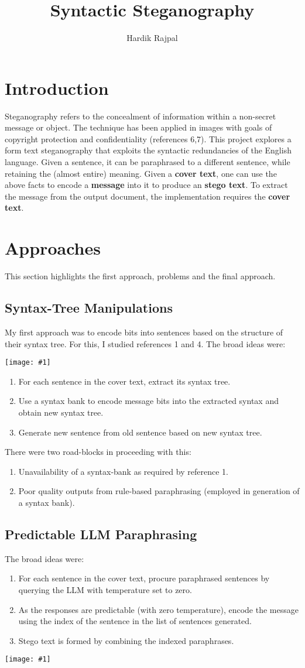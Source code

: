 \documentclass{article}
\author{Hardik Rajpal}
\title{Syntactic Steganography}
\makeatletter
\def\maxwidth#1{\ifdim\Gin@nat@width>#1 #1\else\Gin@nat@width\fi}
\newcommand{\mygraphic}[1]{
\begin{center}
    \texttt{[image: \#1]}
\end{center}
}
\makeatother
\begin{document}
\maketitle
\section{Introduction}
Steganography refers to the concealment of information within a non-secret message or object. The technique has been applied in images with goals of copyright protection and confidentiality (references 6,7). This project explores a form text steganography that exploits the syntactic redundancies of the English language. Given a sentence, it can be
paraphrased to a different sentence, while retaining the (almost entire) meaning. Given a \textbf{cover text}, one can use the above facts to encode a \textbf{message} into it to produce an \textbf{stego text}. To extract the message from the output document, the implementation requires the \textbf{cover text}.
\section{Approaches}
This section highlights the first approach, problems and the final approach.
\subsection{Syntax-Tree Manipulations}
My first approach was to encode bits into sentences based on the structure of their syntax tree. For this, I studied references 1 and 4. The broad ideas were:
\mygraphic{rsrc/syntaxtree.png}
\begin{enumerate}
\item For each sentence in the cover text, extract its syntax tree.
\item Use a syntax bank to encode message bits into the extracted syntax and obtain new syntax tree.
\item Generate new sentence from old sentence based on new syntax tree.
\end{enumerate}
There were two road-blocks in proceeding with this:
\begin{enumerate}
\item Unavailability of a syntax-bank as required by reference 1.
\item Poor quality outputs from rule-based paraphrasing (employed in generation of a syntax bank).
\end{enumerate}
\subsection{Predictable LLM Paraphrasing}
The broad ideas were:
\begin{enumerate}
\item For each sentence in the cover text, procure paraphrased sentences by querying the LLM with temperature set to zero.
\item As the responses are predictable (with zero temperature), encode the message using the index of the sentence in the list of sentences generated.
\item Stego text is formed by combining the indexed paraphrases.
\end{enumerate}
\mygraphic{rsrc/llmstego.jpg}
\end{document}
